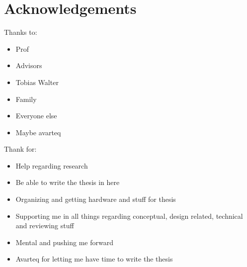 \section*{Acknowledgements}

Thanks to:
\begin{itemize}
\item Prof
\item Advisors
\item Tobias Walter
\item Family
\item Everyone else
\item Maybe avarteq
\end{itemize}

Thank for:
\begin{itemize}
\item Help regarding research
\item Be able to write the thesis in here
\item Organizing and getting hardware and stuff for thesis
\item Supporting me in all things regarding conceptual, design related, technical and reviewing stuff
\item Mental and pushing me forward
\item Avarteq for letting me have time to write the thesis
\end{itemize}
